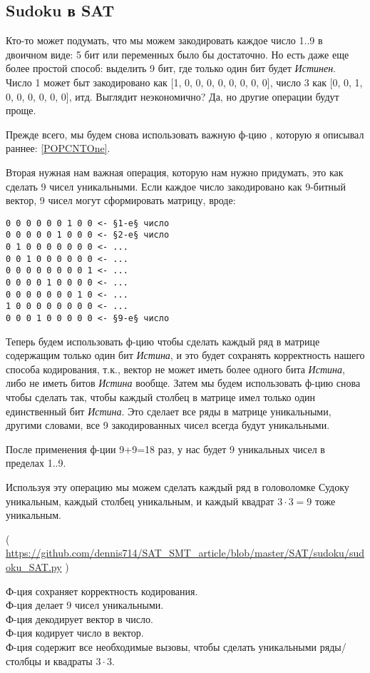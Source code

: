 \subsection{Sudoku в SAT}

Кто-то может подумать, что мы можем закодировать каждое число 1..9 в двоичном виде: 5 бит или переменных было бы достаточно.
Но есть даже еще более простой способ: выделить 9 бит, где только один бит будет \textit{Истинен}.
Число 1 может быт закодировано как [1, 0, 0, 0, 0, 0, 0, 0, 0], число 3 как [0, 0, 1, 0, 0, 0, 0, 0, 0], итд.
Выглядит неэкономично? Да, но другие операции будут проще.

Прежде всего, мы будем снова использовать важную ф-цию , которую я описывал раннее: \ref{POPCNTOne}.

Вторая нужная нам важная операция, которую нам нужно придумать, это как сделать 9 чисел уникальными.
Если каждое число закодировано как 9-битный вектор, 9 чисел могут сформировать матрицу, вроде:

\begin{lstlisting}
0 0 0 0 0 0 1 0 0 <- §1-е§ число
0 0 0 0 0 1 0 0 0 <- §2-е§ число
0 1 0 0 0 0 0 0 0 <- ...
0 0 1 0 0 0 0 0 0 <- ...
0 0 0 0 0 0 0 0 1 <- ...
0 0 0 0 1 0 0 0 0 <- ...
0 0 0 0 0 0 0 1 0 <- ...
1 0 0 0 0 0 0 0 0 <- ...
0 0 0 1 0 0 0 0 0 <- §9-е§ число
\end{lstlisting}

Теперь будем использовать ф-цию  чтобы сделать каждый ряд в матрице содержащим только один бит \textit{Истина},
и это будет сохранять корректность нашего способа кодирования, т.к., вектор не может иметь более одного бита \textit{Истина},
либо не иметь битов \textit{Истина} вообще.
Затем мы будем использовать ф-цию  снова чтобы сделать так, чтобы каждый столбец в матрице имел только
один единственный бит \textit{Истина}.
Это сделает все ряды в матрице уникальными, другими словами, все 9 закодированных чисел всегда будут уникальными.

После применения ф-ции  9+9=18 раз, у нас будет 9 уникальных чисел в пределах 1..9.

Используя эту операцию мы можем сделать каждый ряд в головоломке Судоку уникальным, каждый столбец уникальным,
и каждый квадрат $3 \cdot 3=9$ тоже уникальным.


( \url{https://github.com/dennis714/SAT_SMT_article/blob/master/SAT/sudoku/sudoku_SAT.py} )

Ф-ция  сохраняет корректность кодирования.\\
Ф-ция  делает 9 чисел уникальными.\\
Ф-ция  декодирует вектор в число.\\
Ф-ция  кодирует число в вектор.\\
Ф-ция  содержит все необходимые вызовы, чтобы сделать уникальными ряды/столбцы и квадраты $3\cdot 3$.

